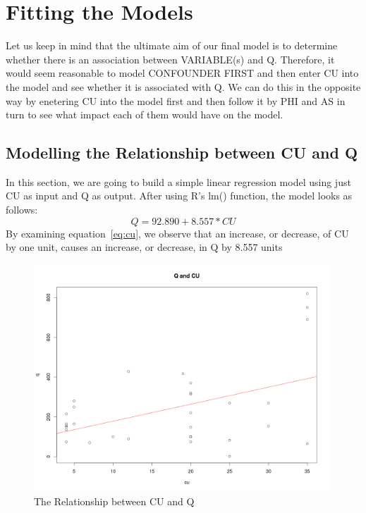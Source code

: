 \documentclass[a4paper,12pt, english]{article}
\begin{document}
\section{Fitting the Models}
Let us keep in mind that the ultimate aim of our final model is to determine whether there is an association between VARIABLE(s) and Q. 
Therefore, it would seem reasonable to model CONFOUNDER FIRST and then enter CU into the model and see whether it is associated with Q. We can do this in the opposite way by enetering CU into the model first and then follow it by PHI and AS in turn to see what impact each of them would have on the model.

\subsection{Modelling the Relationship between CU and Q} 
In this section, we are going to build a simple linear regression model using just CU as input and Q as output. After using R's lm() function, the model looks as follows:\\
\begin{equation}
\label{eq:cu}
Q = 92.890    +    8.557*CU 
\end{equation}       
By examining equation~\ref{eq:cu}, we observe that an increase, or decrease, of CU by one unit, causes an increase, or decrease, in Q by 8.557 units

\begin{figure}[htp!]
  \centering
  \includegraphics[width=0.986\textwidth]{cu-line}
  \caption{The Relationship between CU and Q}
  \label{fig:cu-line}
\end{figure}
\end{document}
